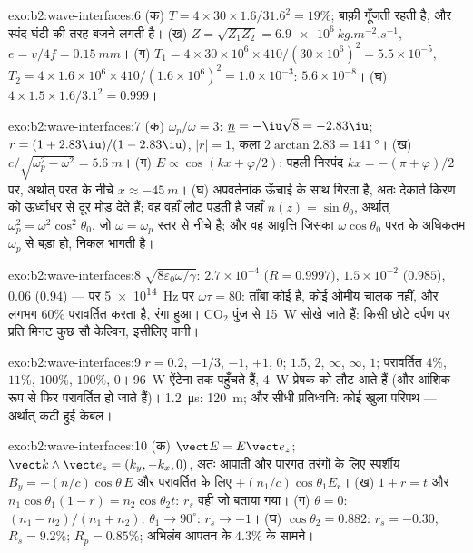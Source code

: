 \begin{solution}{exo:b2:wave-interfaces:6}
(क) $T = 4 \times 30 \times 1.6/31.6^2 = 19\%$; बाक़ी गूँजती रहती है, और स्पंद
घंटी की तरह बजने लगती है। (ख) $Z = \sqrt{Z_1Z_2} = \qty{6.9e6}{kg.m^{-2}.s^{-1}}$, $e = v/4f = \qty{0.15}{mm}$।
(ग) $T_1 = 4 \times 30 \times 10^6 \times 410/(30 \times 10^6)^2 = 5.5 \times 10^{-5}$, $T_2 = 4 \times 1.6 \times
10^6 \times 410/(1.6 \times 10^6)^2 = 1.0 \times 10^{-3}$: $5.6 \times 10^{-8}$। (घ) $4 \times 1.5 \times 1.6/
3.1^2 = 0.999$।
\end{solution}

\begin{solution}{exo:b2:wave-interfaces:7}
(क) $\omega_p/\omega = 3$: $\underline n = -\iu\sqrt8 = -2.83\iu$; $r = (1 + 2.83\iu)/(1 - 2.83
\iu)$, $|r| = 1$, कला $2\arctan2.83 = \qty{141}{\degree}$। (ख) $c/\sqrt{\omega_p^2 - \omega^2}
= \qty{5.6}{m}$। (ग) $E \propto \cos(kx + \varphi/2)$: पहली निस्पंद $kx = -(\pi + \varphi)/2$ पर,
अर्थात् परत के नीचे $x \approx \qty{-45}{m}$। (घ) अपवर्तनांक ऊँचाई के साथ गिरता है, अतः
देकार्त किरण को ऊर्ध्वाधर से दूर मोड़ देते हैं; वह वहाँ लौट पड़ती है जहाँ
$n(z) = \sin\theta_0$, अर्थात् $\omega_p^2 = \omega^2\cos^2\theta_0$, जो $\omega = \omega_p$ स्तर से नीचे है;
और वह आवृत्ति जिसका $\omega\cos\theta_0$ परत के अधिकतम $\omega_p$ से बड़ा हो, निकल
भागती है।
\end{solution}

\begin{solution}{exo:b2:wave-interfaces:8}
$\sqrt{8\varepsilon_0\omega/\gamma}$: $2.7 \times 10^{-4}$ ($R = 0.9997$), $1.5 \times 10^{-2}$ ($0.985$),
$0.06$ ($0.94$) --- पर \qty{5e14}{Hz} पर $\omega\tau = 80$: ताँबा कोई  है,
कोई ओमीय चालक नहीं, और लगभग $60\%$ परावर्तित करता है, रंगा हुआ। CO$_2$ पुंज से
\qty{15}{W} सोखे जाते हैं: किसी छोटे दर्पण पर प्रति मिनट कुछ सौ केल्विन,
इसीलिए पानी।
\end{solution}

\begin{solution}{exo:b2:wave-interfaces:9}
$r = 0.2$, $-1/3$, $-1$, $+1$, $0$;  $1.5$, $2$, $\infty$, $\infty$, $1$; परावर्तित
$4\%$, $11\%$, $100\%$, $100\%$, $0$। \qty{96}{W} ऐंटेना तक पहुँचते हैं, \qty{4}{W}
प्रेषक को लौट आते हैं (और आंशिक रूप से फिर परावर्तित हो जाते हैं)। \qty{1.2}{\micro s}:
\qty{120}{m}; और सीधी प्रतिध्वनि: कोई खुला परिपथ --- अर्थात् कटी हुई केबल।
\end{solution}

\begin{solution}{exo:b2:wave-interfaces:10}
(क) $\vect E = E\vect e_z$; $\vect k\wedge\vect e_z = (k_y, -k_x, 0)$, अतः आपाती और पारगत तरंगों के लिए
स्पर्शीय $B_y = -(n/c)\cos\theta\,E$ और परावर्तित के लिए
$+(n_1/c)\cos\theta_1E_r$। (ख) $1 + r = t$ और $n_1\cos\theta_1
(1 - r) = n_2\cos\theta_2t$: $r_s$ वही जो बताया गया। (ग) $\theta = 0$: $(n_1 - n_2)/(n_1 +
n_2)$; $\theta_1 \to 90^\circ$: $r_s \to -1$। (घ) $\cos\theta_2 = 0.882$: $r_s = -0.30$, $R_s =
9.2\%$; $R_p = 0.85\%$; अभिलंब आपतन के $4.3\%$ के सामने।
\end{solution}

